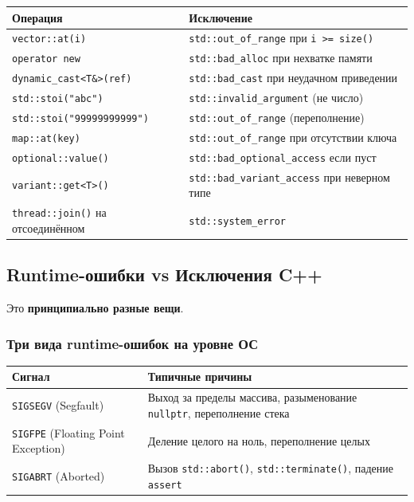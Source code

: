 \documentclass[a4paper,12pt]{article}
\begin{document}
\begin{center}
\begin{tabular}{lp{7cm}}
\toprule
\textbf{Операция} & \textbf{Исключение} \\
\midrule
\texttt{vector::at(i)}
    & \texttt{std::out\_of\_range} при \texttt{i >= size()} \\
\addlinespace
\texttt{operator new}
    & \texttt{std::bad\_alloc} при нехватке памяти \\
\addlinespace
\texttt{dynamic\_cast<T\&>(ref)}
    & \texttt{std::bad\_cast} при неудачном приведении \\
\addlinespace
\texttt{std::stoi("abc")}
    & \texttt{std::invalid\_argument} (не число) \\
\addlinespace
\texttt{std::stoi("99999999999")}
    & \texttt{std::out\_of\_range} (переполнение) \\
\addlinespace
\texttt{map::at(key)}
    & \texttt{std::out\_of\_range} при отсутствии ключа \\
\addlinespace
\texttt{optional::value()}
    & \texttt{std::bad\_optional\_access} если пуст \\
\addlinespace
\texttt{variant::get<T>()}
    & \texttt{std::bad\_variant\_access} при неверном типе \\
\addlinespace
\texttt{thread::join()} на отсоединённом
    & \texttt{std::system\_error} \\
\bottomrule
\end{tabular}
\end{center}

\subsection{Runtime-ошибки vs Исключения C++}

Это \textbf{принципиально разные вещи}.

\subsubsection{Три вида runtime-ошибок на уровне ОС}

\begin{center}
\begin{tabular}{lp{9cm}}
\toprule
\textbf{Сигнал} & \textbf{Типичные причины} \\
\midrule
\texttt{SIGSEGV} (Segfault)
    & Выход за пределы массива, разыменование \texttt{nullptr},
      переполнение стека \\
\addlinespace
\texttt{SIGFPE} (Floating Point Exception)
    & Деление целого на ноль, переполнение целых \\
\addlinespace
\texttt{SIGABRT} (Aborted)
    & Вызов \texttt{std::abort()}, \texttt{std::terminate()},
      падение \texttt{assert} \\
\bottomrule
\end{tabular}
\end{center}
\end{document}
